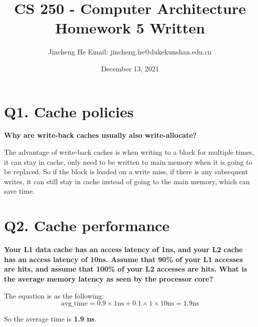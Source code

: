 \documentclass{article}
\title{CS 250 - Computer Architecture \\ Homework 5 Written}
\author{Jincheng He Email: jincheng.he@dukekunshan.edu.cn}
\date{December 13, 2021}
\theoremstyle{remark}
\theoremstyle{definition}
\begin{document}
    \maketitle


    \section{Q1. Cache policies}
    \textbf{Why are write-back caches usually also write-allocate?}

    The advantage of write-back caches is when writing to a block for multiple times, it can stay in cache, only need to be written to main memory when it is going to be replaced.
    So if the block is loaded on a write miss, if there is any subsequent writes, it can still stay in cache instead of going to the main memory, which can save time.


    \section{Q2. Cache performance}
    \textbf{Your L1 data cache has an access latency of 1ns, and your L2 cache has an access latency of 10ns. Assume that 90\% of your L1 accesses are hits, and assume that 100\% of your L2 accesses are hits. What is the average memory latency as seen by the processor core?}

    The equation is as the following:
    \begin{equation*}
        \text{avg\_time} = 0.9 \times 1\text{ns} + 0.1 \times 1 \times 10\text{ns} = 1.9\text{ns}
    \end{equation*}

    So the average time is \textbf{1.9 ns}.
\end{document}
